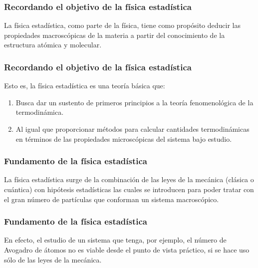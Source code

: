 \documentclass[12pt]{beamer}
\begin{document}
\begin{frame}
\frametitle{Recordando el objetivo de la física estadística}
La física estadística, como parte de la física, tiene como propósito deducir las propiedades macroscópicas de la materia a partir del conocimiento de la estructura atómica y molecular.
\end{frame}
\begin{frame}
\frametitle{Recordando el objetivo de la física estadística}
Esto es, la física estadística es una teoría básica que:
\pause
{}
\begin{enumerate}[<+->]
\item Busca dar un sustento de primeros principios a la teoría fenomenológica de la termodinámica.
\item Al igual que proporcionar métodos para calcular cantidades termodinámicas en términos de las propiedades microscópicas del sistema bajo estudio.
\end{enumerate}
\end{frame}
\begin{frame}
\frametitle{Fundamento de la física estadística}
La física estadística surge de la combinación de las leyes de la mecánica (clásica o cuántica) con hipótesis estadísticas las cuales se introducen para poder tratar con el gran número de partículas que conforman un sistema macroscópico.
\end{frame}
\begin{frame}
\frametitle{Fundamento de la física estadística}
En efecto, el estudio de un sistema que tenga, por ejemplo, el número de Avogadro de átomos no es viable desde el punto de vista práctico, si se hace uso sólo de las leyes de la mecánica.
\end{frame}
\end{document}
